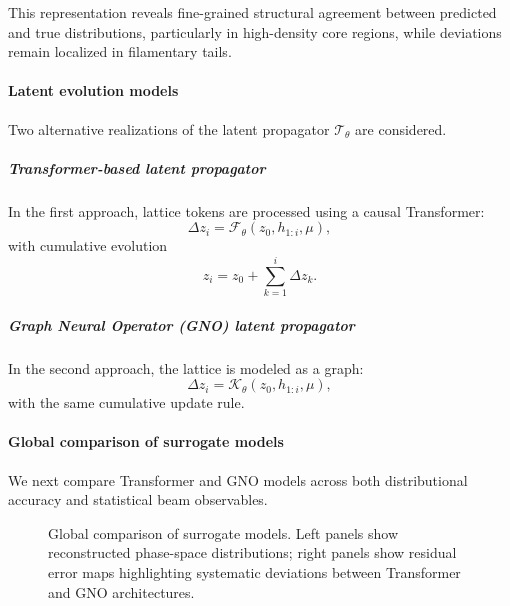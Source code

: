 \documentclass[11pt,a4paper]{article}
\begin{document}
\begin{sloppypar}
This representation reveals fine-grained structural agreement between predicted and true distributions, particularly in high-density core regions, while deviations remain localized in filamentary tails.

\paragraph{Latent evolution models}

Two alternative realizations of the latent propagator $\mathcal{T}_\theta$ are considered.

\subparagraph{Transformer-based latent propagator}

In the first approach, lattice tokens are processed using a causal Transformer:
\begin{equation}
\Delta z_i = \mathcal{F}_\theta(z_0, h_{1:i}, \mu),
\end{equation}
with cumulative evolution
\begin{equation}
z_i = z_0 + \sum_{k=1}^{i} \Delta z_k.
\end{equation}

\subparagraph{Graph Neural Operator (GNO) latent propagator}

In the second approach, the lattice is modeled as a graph:
\begin{equation}
\Delta z_i = \mathcal{K}_\theta(z_0, h_{1:i}, \mu),
\end{equation}
with the same cumulative update rule.

\paragraph{Global comparison of surrogate models}

We next compare Transformer and GNO models across both distributional accuracy and statistical beam observables.

\begin{figure}[H]
\centering
\caption{\small Global comparison of surrogate models. Left panels show reconstructed phase-space distributions; right panels show residual error maps highlighting systematic deviations between Transformer and GNO architectures.}
\label{fig:global_comparison}
\end{figure}


\end{sloppypar}
\end{document}
